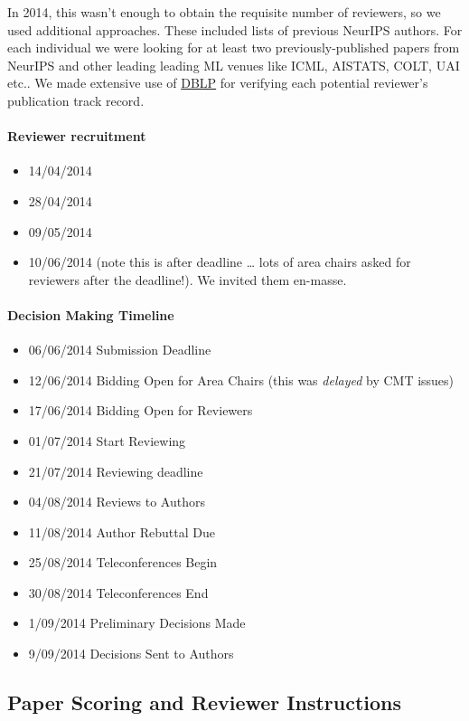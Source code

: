 In 2014, this wasn't enough to obtain the requisite number of reviewers,
so we used additional approaches. These included lists of previous
NeurIPS authors. For each individual we were looking for at least two
previously-published papers from NeurIPS and other leading leading ML
venues like ICML, AISTATS, COLT, UAI etc.. We made extensive use of
\href{https://dblp.uni-trier.de/}{DBLP} for verifying each potential
reviewer's publication track record.

\paragraph{Reviewer recruitment}

\begin{itemize}
\tightlist
\item
  14/04/2014
\item
  28/04/2014
\item
  09/05/2014
\item
  10/06/2014 (note this is after deadline \ldots{} lots of area chairs
  asked for reviewers after the deadline!). We invited them en-masse.
\end{itemize}

\paragraph{Decision Making Timeline}

\begin{itemize}
\tightlist
\item
  06/06/2014 Submission Deadline
\item
  12/06/2014 Bidding Open for Area Chairs (this was \emph{delayed} by
  CMT issues)
\item
  17/06/2014 Bidding Open for Reviewers
\item
  01/07/2014 Start Reviewing
\item
  21/07/2014 Reviewing deadline
\item
  04/08/2014 Reviews to Authors
\item
  11/08/2014 Author Rebuttal Due
\item
  25/08/2014 Teleconferences Begin
\item
  30/08/2014 Teleconferences End
\item
  1/09/2014 Preliminary Decisions Made
\item
  9/09/2014 Decisions Sent to Authors
\end{itemize}

\hypertarget{paper-scoring-and-reviewer-instructions}{%
\subsection{Paper Scoring and Reviewer
Instructions}\label{paper-scoring-and-reviewer-instructions}}

